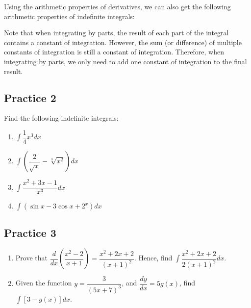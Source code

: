 \documentclass{report}
\begin{document}
Using the arithmetic properties of derivatives, we can also get the following
arithmetic properties of indefinite integrals:
\begin{center}
\end{center}
\vspace{0.9em}

Note that when integrating by parts, the result of each part of the integral
contains a constant of integration. However, the sum (or difference) of
multiple constants of integration is still a constant of integration.
Therefore, when integrating by parts, we only need to add one constant of
integration to the final result.

\subsection{Practice 2}
Find the following indefinite integrals:
\begin{enumerate}
    \item $\displaystyle\int{\dfrac{1}{4}}x^{3}dx$
    \item $\displaystyle\int{\left(\dfrac{2}{\sqrt{x}} - \sqrt[3]{x^2}\right)dx}$
    \item $\displaystyle\int{\dfrac{x^2 + 3x - 1}{x^3}}dx$
    \item $\displaystyle\int{\left(\sin x - 3\cos x + 2^x\right)dx}$
\end{enumerate}

\subsection{Practice 3}
\begin{enumerate}
    \item Prove that $\dfrac{d}{dx}\left(\dfrac{x^2 - 2}{x + 1}\right) = \dfrac{x^2 + 2x
                  + 2}{(x + 1)^2}$. Hence, find $\displaystyle\int{\dfrac{x^2 + 2x +
                      2}{2(x+1)^2}}dx$.
    \item Given the function $y = \dfrac{3}{(5x + 7)^3}$, and $\dfrac{dy}{dx} = 5g(x)$,
          find $\displaystyle\int\left[3 - g(x)\right]dx$.
\end{enumerate}
\end{document}
